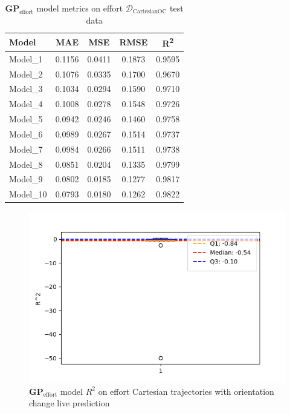     \begin{table}[H]
    \centering
    \begin{tabular}{lcccc}
    \toprule
    \textbf{Model} & \textbf{MAE} & \textbf{MSE} & \textbf{RMSE} & \textbf{R\textsuperscript{2}} \\
    \midrule
    Model\_1 & 0.1156 & 0.0411 & 0.1873 & 0.9595 \\
    Model\_2 & 0.1076 & 0.0335 & 0.1700 & 0.9670 \\
    Model\_3 & 0.1034 & 0.0294 & 0.1590 & 0.9710 \\
    Model\_4 & 0.1008 & 0.0278 & 0.1548 & 0.9726 \\
    Model\_5 & 0.0942 & 0.0246 & 0.1460 & 0.9758 \\
    Model\_6 & 0.0989 & 0.0267 & 0.1514 & 0.9737 \\
    Model\_7 & 0.0984 & 0.0266 & 0.1511 & 0.9738 \\
    Model\_8 & 0.0851 & 0.0204 & 0.1335 & 0.9799 \\
    Model\_9 & 0.0802 & 0.0185 & 0.1277 & 0.9817 \\
    Model\_10 & 0.0793 & 0.0180 & 0.1262 & 0.9822 \\
    \bottomrule
    \end{tabular}
    \caption{\(\boldsymbol{GP}_{\text{effort}}\) model metrics on effort \(\mathcal{D}_{\text{CartesianOC}}\) test data}
    \end{table}

    \begin{figure}[H]
    \centering
    \includegraphics[width=1\columnwidth]{Images/05_results/effort_boxplot_live_OC_R^2.png}
    \caption[\(\boldsymbol{GP}_{\text{effort}}\) model \(R^2\) on effort Cartesian trajectories with orientation change live prediction]{\(\boldsymbol{GP}_{\text{effort}}\) model \(R^2\) on effort Cartesian trajectories with orientation change live prediction}
    \label{fig:effort_oc_R^2_live}
    \end{figure}

